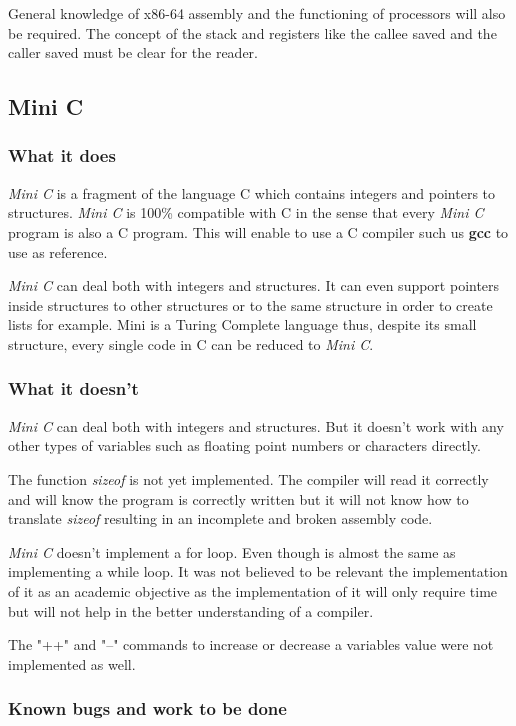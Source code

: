 \documentclass[conference]{IEEEtran}
\theoremstyle{definition}
\begin{document}
General knowledge of x86-64 assembly and the functioning of processors will also be required. The concept of the stack and registers like the callee saved and the caller saved must be clear for the reader.

\subsection{Mini C}
\subsubsection{What it does}
\textit{Mini C} is a fragment of the language C which contains integers and pointers to structures. \textit{Mini C} is 100\% compatible with C in the sense that every \textit{Mini C} program is also a C program. This will enable to use a C compiler such us \textbf{gcc} to use as reference.

\textit{Mini C} can deal both with integers and structures. It can even support pointers inside structures to other structures or to the same structure in order to create lists for example. Mini is a Turing Complete language thus, despite its small structure, every single code in C can be reduced to \textit{Mini C}.

\subsubsection{What it doesn't}
\textit{Mini C} can deal both with integers and structures. But it doesn't work with any other types of variables such as floating point numbers or characters directly.

The function \textit{sizeof} is not yet implemented. The compiler will read it correctly and will know the program is correctly written but it will not know how to translate \textit{sizeof} resulting in an incomplete and broken assembly code.

\textit{Mini C} doesn't implement a for loop. Even though is almost the same as implementing a while loop. It was not believed to be relevant the implementation of it as an academic objective as the implementation of it will only require time but will not help in the better understanding of a compiler.

The "++" and "--" commands to increase or decrease a variables value were not implemented as well.

\subsubsection{Known bugs and work to be done}
\end{document}
